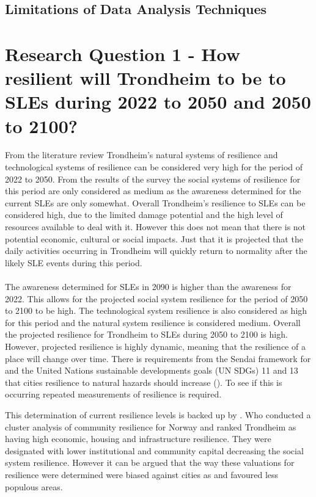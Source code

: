 \subsection{Limitations of Data Analysis Techniques }


\section{Research Question 1 - How resilient will Trondheim to be to SLEs during 2022 to 2050 and 2050 to 2100? }
From the literature review Trondheim's natural systems of resilience and technological systems of resilience can be considered very high for the period of 2022 to 2050. From the results of the survey the  social systems of resilience for this period are only considered as medium as the awareness determined for the current SLEs are only somewhat. Overall Trondheim's resilience to SLEs can be considered high, due to the limited damage potential and the high level of resources available to deal with it. However this does not mean that there is not potential economic, cultural or social impacts. Just that it is projected that the daily activities occurring in Trondheim will quickly return to normality after the likely SLE events during this period.
\paragraph{}
The awareness determined for SLEs in 2090 is higher than the awareness for 2022. This allows for the projected social system resilience for the period of 2050 to 2100 to be high. The technological system resilience is also considered as high for this period and the natural system resilience is considered medium. Overall the projected resilience for Trondheim to SLEs during 2050 to 2100 is high. However, projected resilience is highly dynamic, meaning that the resilience of a place will change over time. There is requirements from the Sendai framework for and the United Nations sustainable developments goals (UN SDGs) 11 and 13 that cities resilience to natural hazards should increase (\cite{gonzalez-riancho_storm_2017}). To see if this is occurring repeated measurements of resilience is required. 

This determination of current resilience levels is backed up by \cite{opach_seeking_2020}. Who conducted a cluster analysis of community resilience for Norway and ranked Trondheim as having high economic, housing and infrastructure resilience. They were designated with lower institutional and community capital decreasing the social system resilience. However it can be argued that the way these valuations for resilience were determined were biased against cities as and favoured less populous areas.

